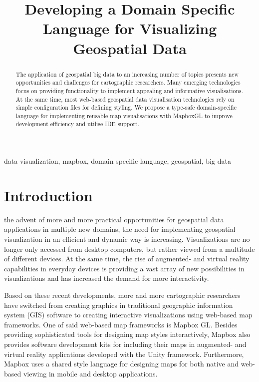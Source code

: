 \documentclass[conference]{IEEEtran}
\begin{document}
\title{Developing a Domain Specific Language for Visualizing Geospatial Data}

\author{
\and
{}
}

\maketitle

\begin{abstract}
The application of geospatial big data to an increasing number of topics presents new opportunities and challenges for cartographic researchers. Many emerging technologies focus on providing functionality to implement appealing and informative visualisations. At the same time, most web-based geospatial data visualisation technologies rely on simple configuration files for defining styling. We propose a type-safe domain-specific language for implementing reusable map visualisations with MapboxGL to improve development efficiency and utilise IDE support.
\end{abstract}

\begin{IEEEkeywords}
data visualization, mapbox, domain specific language, geospatial, big data
\end{IEEEkeywords}

\section{Introduction}
 the advent of more and more practical opportunities for geospatial data applications in multiple new domains, the need for implementing geospatial visualization in an efficient and dynamic way is increasing. Visualizations are no longer only accessed from desktop computers, but rather viewed from a multitude of different devices. 
At the same time, the rise of augmented- and virtual reality capabilities in everyday devices is providing a vast array of new possibilities in visualizations and has increased the demand for more interactivity. 

Based on these recent developments, more and more cartographic researchers have switched from creating graphics in traditional geographic information system (GIS) software to creating interactive visualizations using web-based map frameworks. 
One of said web-based map frameworks is Mapbox GL. Besides providing sophisticated tools for designing map styles interactively\cite{dunn2017custom}, Mapbox also provides software development kits for including their maps in augmented- and virtual reality applications developed with the Unity framework.
Furthermore, Mapbox uses a shared style language for designing maps for both native and web-based viewing in mobile and desktop applications.
\end{document}
